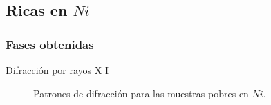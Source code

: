 \documentclass[11pt]{beamer}
\begin{document}
	\subsection{Ricas en $Ni$}	
		\subsubsection{Fases obtenidas}
			\begin{frame}{Difracción por rayos X I}
				\begin{figure}[H]
				\captionsetup[subfloat]{labelformat=empty}
					 \qquad
					\caption*{Patrones de difracción para las muestras pobres en $Ni$.}
				\end{figure}		
			\end{frame}
			
\end{document}
